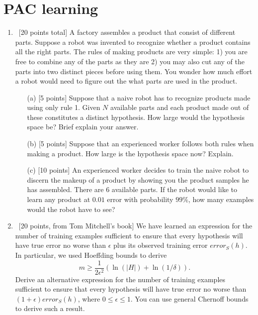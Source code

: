 \section{PAC learning}
\label{sec:pac-learning}
\begin{enumerate}

\item ~[20 points total] A factory assembles a product that consist of
  different parts. Suppose a robot was invented to recognize whether a
  product contains all the right parts. The rules of making products
  are very simple: 1) you are free to combine any of the parts as they
  are 2) you may also cut any of the parts into two distinct pieces
  before using them. You wonder how much effort a robot would need to
  figure out the what parts are used in the product.

\begin{itemize}
\item[(a)] [5 points] Suppose that a naive robot has to recognize
  products made using only rule 1. Given $N$ available parts and each
  product made out of these constitutes a distinct hypothesis. How
  large would the hypothesis space be? Brief explain your answer.
    
\item[(b)] [5 points] Suppose that an experienced worker follows both
  rules when making a product. How large is the hypothesis space now?
  Explain.

\item[(c)] [10 points] An experienced worker decides to train the
  naive robot to discern the makeup of a product by showing you the
  product samples he has assembled. There are 6 available parts. If
  the robot would like to learn any product at $0.01$ error with
  probability $99\%$, how many examples would the robot have to see?
\end{itemize}


\item ~[20 points, from Tom Mitchell's book] We have learned an
  expression for the number of training examples sufficient to ensure
  that every hypothesis will have true error no worse than $\epsilon$
  plus its observed training error $error_S(h)$. In particular, we
  used Hoeffding bounds to derive
\[
	m \geq  \frac{1}{2 \epsilon^2}(\ln(|H|) + \ln(1/\delta)).
\]
Derive an alternative expression for the number of training examples
sufficient to ensure that every hypothesis will have true error no
worse than $(1+\epsilon)error_S(h)$, where $0 \leq \epsilon \leq 1$. You can use general Chernoff bounds
to derive such a result.


\end{enumerate}
